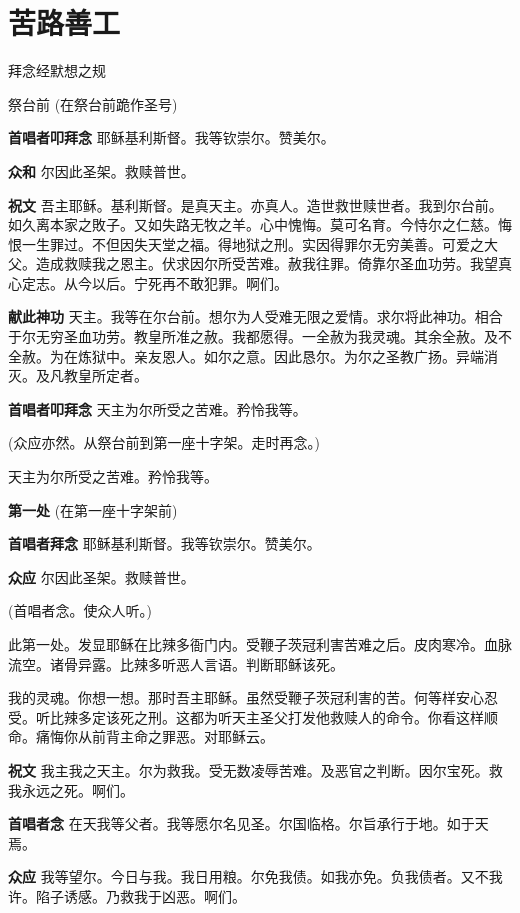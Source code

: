 \documentclass[UTF8,17pt]{ctexart}
\begin{document}
\section{苦路善⼯}

拜念经默想之规

祭台前 (在祭台前跪作圣号)

\textbf{⾸唱者叩拜念} \quad 耶稣基利斯督。我等钦崇尔。赞美尔。

\textbf{众和} \quad 尔因此圣架。救赎普世。

\textbf{祝⽂} \quad 吾主耶稣。基利斯督。是真天主。亦真⼈。造世救世赎世者。我到尔台前。如久离本家之敗⼦。又如失路⽆牧之⽺。⼼中愧悔。莫可名育。今恃尔之仁慈。悔恨⼀⽣罪过。不但因失天堂之福。得地狱之刑。实因得罪尔⽆穷美善。可爱之⼤⽗。造成救赎我之恩主。伏求因尔所受苦难。赦我往罪。倚靠尔圣⾎功劳。我望真⼼定志。从今以后。宁死再不敢犯罪。啊们。

\textbf{献此神功} \quad 天主。我等在尔台前。想尔为⼈受难⽆限之爱情。求尔将此神功。相合于尔⽆穷圣⾎功劳。教皇所准之赦。我都愿得。⼀全赦为我灵魂。其余全赦。及不全赦。为在炼狱中。亲友恩⼈。如尔之意。因此恳尔。为尔之圣教⼴扬。异端消灭。及凡教皇所定者。


\textbf{⾸唱者叩拜念} \quad 天主为尔所受之苦难。矜怜我等。

(众应亦然。从祭台前到第⼀座⼗字架。⾛时再念。)

天主为尔所受之苦难。矜怜我等。

\textbf{第一处} (在第⼀座⼗字架前)

\textbf{⾸唱者拜念} \quad 耶稣基利斯督。我等钦崇尔。赞美尔。

\textbf{众应} \quad 尔因此圣架。救赎普世。

(⾸唱者念。使众⼈听。)

此第⼀处。发显耶稣在⽐辣多衙门内。受鞭⼦茨冠利害苦难之后。⽪⾁寒冷。⾎脉流空。诸⾻异露。⽐辣多听恶⼈⾔语。判断耶稣该死。

我的灵魂。你想⼀想。那时吾主耶稣。虽然受鞭⼦茨冠利害的苦。何等样安⼼忍受。听⽐辣多定该死之刑。这都为听天主圣⽗打发他救赎⼈的命令。你看这样顺命。痛悔你从前背主命之罪恶。对耶稣云。

\textbf{祝⽂} \quad 我主我之天主。尔为救我。受⽆数凌辱苦难。及恶官之判断。因尔宝死。救我永远之死。啊们。

\textbf{⾸唱者念} \quad 在天我等⽗者。我等愿尔名见圣。尔国临格。尔旨承⾏于地。如于天焉。

\textbf{众应} \quad 我等望尔。今⽇与我。我⽇⽤粮。尔免我债。如我亦免。负我债者。又不我许。陷⼦诱感。乃救我于凶恶。啊们。
\end{document}
